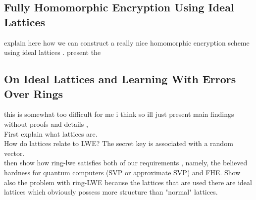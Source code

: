 \subsection{Fully Homomorphic Encryption Using Ideal Lattices}
explain here how we can construct a really nice homomorphic encryption scheme using ideal lattices \cite{gentry}. present the 
\subsection{On Ideal Lattices and Learning With Errors Over Rings}
this is somewhat too difficult for me i think so ill just present main findings without proofs and details \cite{regev}, \\
First explain what lattices are. \\
How do lattices relate to LWE? The secret key is associated with a random vector. \\
then show how ring-lwe satisfies both of our requirements \cite{ring-lwe}, namely, the believed hardness for quantum computers (SVP or approximate SVP) and FHE. Show also the problem with ring-LWE because the lattices that are used there are ideal lattices which obviously possess more structure than "normal" lattices.
